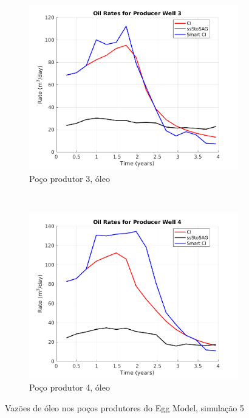 \begin{figure}[!ht]
	\begin{subfigure}[b]{.45\textwidth}
		\includegraphics[width=\textwidth]{figs/resultadosEgg/imgsim5/EGG_OilWell3_Zoom}
		\caption{Po\c{c}o produtor 3, \'{o}leo}
		\label{EGG5_OilWell3}
	\end{subfigure}
	~
	\begin{subfigure}[b]{.45\textwidth}
		\includegraphics[width=\textwidth]{figs/resultadosEgg/imgsim5/EGG_OilWell4_Zoom}
		\caption{Po\c{c}o produtor 4, \'{o}leo}
		\label{EGG5_OilWell4}
	\end{subfigure}
	\caption{Vaz\~{o}es de \'{o}leo nos po\c{c}os produtores do Egg Model, simula\c{c}\~{a}o 5}
	\label{EGG5_OilRates}
\end{figure}

